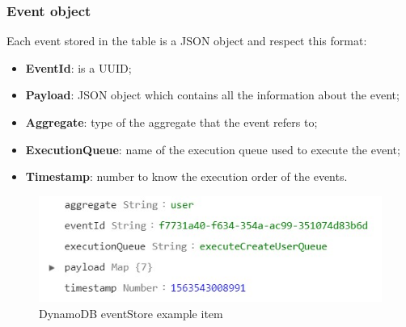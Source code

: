 \subsubsection{Event object}
Each event stored in the table is a JSON object and respect this format:
\begin{itemize}
	\item \textbf{EventId}: is a UUID;
	\item \textbf{Payload}:	JSON object which contains all the information about the event;
	\item \textbf{Aggregate}: type of the aggregate that the event refers to;
	\item \textbf{ExecutionQueue}: name of the execution queue used to execute the event;
	\item \textbf{Timestamp}: number to know the execution order of the events.
\end{itemize}

\begin{figure} [H]
	\centering
	\includegraphics[scale=1.2]{../Img/event_object}
	\caption{DynamoDB eventStore example item}\label{}
\end{figure}


